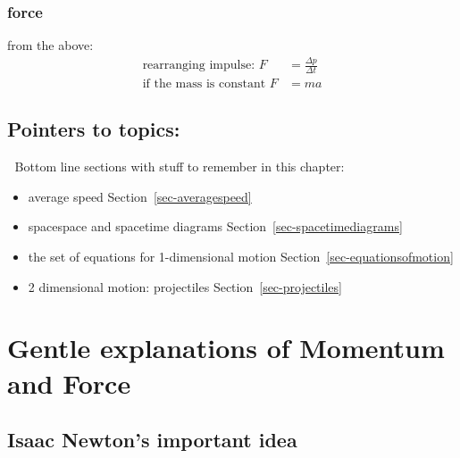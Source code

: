 \documentclass[
  letterpaper,
  DIV=11,
  numbers=noendperiod,
  oneside]{scrreprt}
\begin{document}
\subsection{force}\label{force}

from the above: \[
\begin{align}
\text{rearranging impulse: }F &= \frac{\Delta p}{\Delta t} \\
\text{if the mass is constant } F &= ma
\end{align}
\]

\section{Pointers to topics:}\label{pointers-to-topics-1}

\begin{tcolorbox}[enhanced jigsaw, toprule=.15mm, opacityback=0, colframe=quarto-callout-tip-color-frame, rightrule=.15mm, coltitle=black, bottomtitle=1mm, colbacktitle=quarto-callout-tip-color!10!white, bottomrule=.15mm, toptitle=1mm, titlerule=0mm, title={Tip}, arc=.35mm, leftrule=.75mm, left=2mm, colback=white, breakable, opacitybacktitle=0.6]

🔐 Bottom line sections with stuff to remember in this chapter:

\begin{itemize}
\item
  average speed Section~\ref{sec-averagespeed}
\item
  spacespace and spacetime diagrams Section~\ref{sec-spacetimediagrams}
\item
  the set of equations for 1-dimensional motion
  Section~\ref{sec-equationsofmotion}
\item
  2 dimensional motion: projectiles Section~\ref{sec-projectiles}
\end{itemize}

\end{tcolorbox}

\chapter{Gentle explanations of Momentum and
Force}\label{gentle-explanations-of-momentum-and-force}

\section{Isaac Newton's important
idea}\label{isaac-newtons-important-idea}
\end{document}
